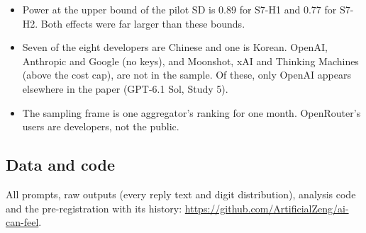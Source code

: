 \documentclass[
  11pt,
]{article}
\providecommand{\tightlist}{%
  \setlength{\itemsep}{0pt}\setlength{\parskip}{0pt}}
\begin{document}
\begin{itemize}
  \begin{itemize}
  \tightlist
  \item
    Power at the upper bound of the pilot SD is 0.89 for S7-H1 and 0.77
    for S7-H2. Both effects were far larger than these bounds.
  \item
    Seven of the eight developers are Chinese and one is Korean. OpenAI,
    Anthropic and Google (no keys), and Moonshot, xAI and Thinking
    Machines (above the cost cap), are not in the sample. Of these, only
    OpenAI appears elsewhere in the paper (GPT-6.1 Sol, Study 5).
  \item
    The sampling frame is one aggregator's ranking for one month.
    OpenRouter's users are developers, not the public.
  \end{itemize}
\end{itemize}

\hypertarget{data-and-code}{%
\subsection{Data and code}\label{data-and-code}}

All prompts, raw outputs (every reply text and digit distribution),
analysis code and the pre-registration with its history:
\url{https://github.com/ArtificialZeng/ai-can-feel}.
\end{document}
